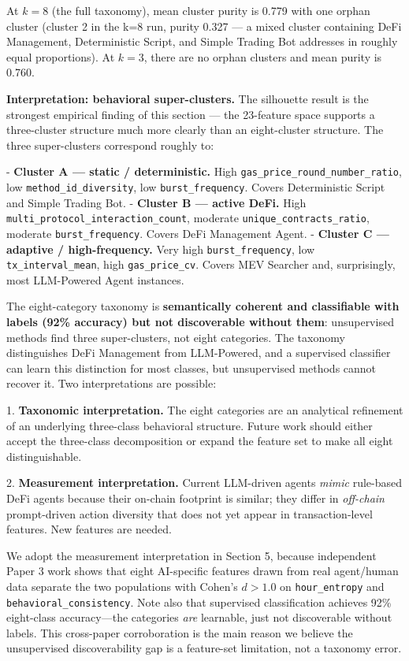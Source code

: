 \documentclass[sigconf,nonacm=false]{acmart}
\begin{document}
At $k=8$ (the full taxonomy), mean cluster purity is 0.779 with one orphan cluster (cluster 2 in the k=8 run, purity 0.327 --- a mixed cluster containing DeFi Management, Deterministic Script, and Simple Trading Bot addresses in roughly equal proportions). At $k=3$, there are no orphan clusters and mean purity is 0.760.

\textbf{Interpretation: behavioral super-clusters.} The silhouette result is the strongest empirical finding of this section --- the 23-feature space supports a three-cluster structure much more clearly than an eight-cluster structure. The three super-clusters correspond roughly to:

- \textbf{Cluster A --- static / deterministic.} High \texttt{gas\_price\_round\_number\_ratio}, low \texttt{method\_id\_diversity}, low \texttt{burst\_frequency}. Covers Deterministic Script and Simple Trading Bot.
- \textbf{Cluster B --- active DeFi.} High \texttt{multi\_protocol\_interaction\_count}, moderate \texttt{unique\_contracts\_ratio}, moderate \texttt{burst\_frequency}. Covers DeFi Management Agent.
- \textbf{Cluster C --- adaptive / high-frequency.} Very high \texttt{burst\_frequency}, low \texttt{tx\_interval\_mean}, high \texttt{gas\_price\_cv}. Covers MEV Searcher and, surprisingly, most LLM-Powered Agent instances.

The eight-category taxonomy is \textbf{semantically coherent and classifiable with labels (92\% accuracy) but not discoverable without them}: unsupervised methods find three super-clusters, not eight categories. The taxonomy distinguishes DeFi Management from LLM-Powered, and a supervised classifier can learn this distinction for most classes, but unsupervised methods cannot recover it. Two interpretations are possible:

1. \textbf{Taxonomic interpretation.} The eight categories are an analytical refinement of an underlying three-class behavioral structure. Future work should either accept the three-class decomposition or expand the feature set to make all eight distinguishable.

2. \textbf{Measurement interpretation.} Current LLM-driven agents \textit{mimic} rule-based DeFi agents because their on-chain footprint is similar; they differ in \textit{off-chain} prompt-driven action diversity that does not yet appear in transaction-level features. New features are needed.

We adopt the measurement interpretation in Section 5, because independent Paper 3 work shows that eight AI-specific features drawn from real agent/human data separate the two populations with Cohen's $d > 1.0$ on \texttt{hour\_entropy} and \texttt{behavioral\_consistency}. Note also that supervised classification achieves 92\% eight-class accuracy---the categories \emph{are} learnable, just not discoverable without labels. This cross-paper corroboration is the main reason we believe the unsupervised discoverability gap is a feature-set limitation, not a taxonomy error.
\end{document}
